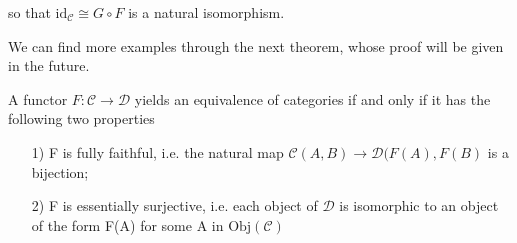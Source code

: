 \documentclass[../category_theory.tex]{subfiles}
\begin{document}
\begin{example}
\begin{center}
	\end{center}
	so that \(\mathrm{id}_{\mathcal{C}}\cong G\circ F\) is a natural isomorphism.
\end{example}
We can find more examples through the next theorem, whose proof will be given in the future.
\begin{theorem*}
	A functor \(F:\mathcal{C}\rightarrow \mathcal{D}\) yields an equivalence of categories if and only if it has the following two properties
	\begin{itemize}
		\item[1)] F is fully faithful, i.e. the natural map \(\mathcal{C}(A, B)\rightarrow \mathcal{D}(F(A), F(B)\) is a bijection;
		\item[2)] F is essentially surjective, i.e. each object of \(\mathcal{D}\) is isomorphic to an object of the form F(A) for some A in
		      \(\mathrm{Obj}(\mathcal{C})\)
	\end{itemize}
\end{theorem*}
\end{document}

